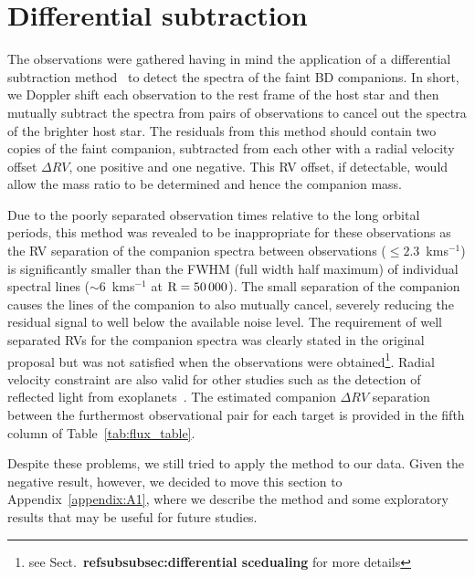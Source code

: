 \section{Differential subtraction}
\label{sec:spec_diff}

The observations were gathered having in mind the application of a differential subtraction method~\citep[e.g.][]{ferluga_separating_1997, kostogryz_spectral_2013} to detect the spectra of the faint BD companions. In short, we Doppler shift each observation to the rest frame of the host star and then mutually subtract the spectra from pairs of observations to cancel out the spectra of the brighter host star. The residuals from this method should contain two copies of the faint companion, subtracted from each other with a radial velocity offset \(\Delta RV\), one positive and one negative. This RV offset, if detectable, would allow the mass ratio to be determined and hence the companion mass. 

Due to the poorly separated observation times relative to the long orbital periods, this method was revealed to be inappropriate for these observations as the RV separation of the companion spectra between observations (\(\le 2.3\)~kms\(^{-1}\)) is significantly smaller than the FWHM (full width half maximum) of individual spectral lines (\(\sim\)6~kms\(^{-1}\) at \(\rm R=50\,000\)).  The small separation of the companion causes the lines of the companion to also mutually cancel, severely reducing the residual signal to well below the available noise level. The requirement of well separated RVs for the companion spectra was clearly stated in the original proposal but was not satisfied when the observations were obtained\footnote{see Sect.~\textbf{ref{subsubsec:differential scedualing}} for more details}. Radial velocity constraint are also valid for other studies such as the detection of reflected light from exoplanets~\cite{martins_evidence_2015}. The estimated companion \(\Delta RV\) separation between the furthermost observational pair for each target is provided in the fifth column of Table~\ref{tab:flux_table}. 

Despite these problems, we still tried to apply the method to our data. Given the negative result, however, we decided to move this section to Appendix~\ref{appendix:A1}, where we describe the method and some exploratory results that may be useful for future studies.



